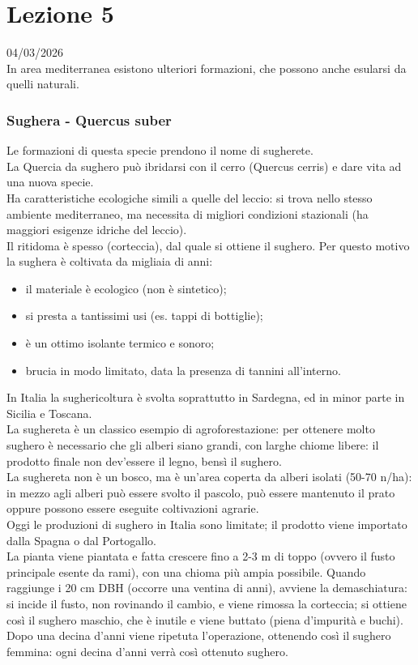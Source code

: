 \section{Lezione 5} \hfill 04/03/2026\\
In area mediterranea esistono ulteriori formazioni, che possono anche esularsi da quelli naturali.
\subsubsection{Sughera - Quercus suber}
Le formazioni di questa specie prendono il nome di sugherete.\\
La Quercia da sughero può ibridarsi con il cerro (Quercus cerris) e dare vita ad una nuova specie.\\
Ha caratteristiche ecologiche simili a quelle del leccio: si trova nello stesso ambiente mediterraneo, ma necessita di migliori condizioni stazionali (ha maggiori esigenze idriche del leccio).\\
Il ritidoma è spesso (corteccia), dal quale si ottiene il sughero. Per questo motivo la sughera è coltivata da migliaia di anni:
\begin{itemize}[nosep]
    \item il materiale è ecologico (non è sintetico);
    \item si presta a tantissimi usi (es. tappi di bottiglie);
    \item è un ottimo isolante termico e sonoro;
    \item brucia in modo limitato, data la presenza di tannini all'interno.
\end{itemize}
In Italia la sughericoltura è svolta soprattutto in Sardegna, ed in minor parte in Sicilia e Toscana.\\
La sughereta è un classico esempio di agroforestazione: per ottenere molto sughero è necessario che gli alberi siano grandi, con larghe  chiome libere: il prodotto finale non dev'essere il legno, bensì il sughero.\\
La sughereta non è un bosco, ma è un'area coperta da alberi isolati (50-70 \unit{n/ha}): in mezzo agli alberi può essere svolto il pascolo, può essere mantenuto il prato oppure possono essere eseguite coltivazioni agrarie.\\
Oggi le produzioni di sughero in Italia sono limitate; il prodotto viene importato dalla Spagna o dal Portogallo.\\
La pianta viene piantata e fatta crescere fino a 2-3 m di toppo (ovvero il fusto principale esente da rami), con una chioma più ampia possibile. Quando raggiunge i 20 cm DBH (occorre una ventina di anni), avviene la demaschiatura: si incide il fusto, non rovinando il cambio, e viene rimossa la corteccia; si ottiene così il sughero maschio, che è inutile e viene buttato (piena d'impurità e buchi). Dopo una decina d'anni viene ripetuta l'operazione, ottenendo così il sughero femmina: ogni decina d'anni verrà così ottenuto sughero.\\

